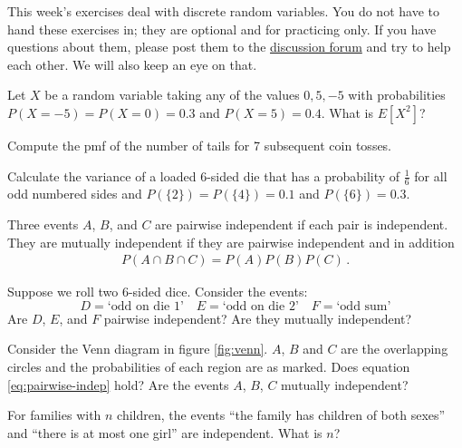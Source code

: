 \documentclass[a4paper,10pt,landscape,twocolumn]{scrartcl}
\begin{document}
\practiceproblems

{\sffamily\noindent
This week's exercises deal with discrete random variables. You do not have to hand these exercises in; they are optional and for practicing only. If you have questions about them, please post them to the \href{https://www.moodle.ch/lms/mod/forum/view.php?id=1634}{discussion forum} and try to help each other. We will also keep an eye on that.
}


\begin{exercise}[]
Let $X$ be a random variable taking any of the values $0, 5, -5$ with probabilities $P(X=-5) = P(X	= 0) = 0.3$ and $P(X=5) = 0.4$. What is $E[X^2]$?
\end{exercise}

\begin{exercise}[]
Compute the pmf of the number of tails for 7 subsequent coin tosses.	
\end{exercise}

\begin{exercise}[]
	Calculate the variance of a loaded 6-sided die that has a probability of $\frac 1 6$ for all odd numbered sides and $P(\{2\}) = P(\{4\}) =0.1$ and $P(\{6\}) = 0.3$.
\end{exercise}


\begin{exercise}[Independence]
Three events $A$, $B$, and $C$ are pairwise independent if each pair is independent. They are mutually independent if they are pairwise independent and in addition
	\begin{align}\label{eq:pairwise-indep}
		P(A \cap B \cap C) = P(A) P(B) P(C) \, .
	\end{align}
	\begin{subex}
	Suppose we roll two 6-sided dice. Consider the events:
	\[
		D = \text{`odd on die 1'} \quad
		E = \text{`odd on die 2'} \quad
		F = \text{`odd sum'}
	\]
	Are $D$, $E$, and $F$ pairwise independent? Are they mutually independent?	
	\end{subex}
	
	\begin{subex}
		Consider the Venn diagram in figure \ref{fig:venn}. $A$, $B$ and $C$ are the overlapping circles and the probabilities of each region are as marked. Does equation \ref{eq:pairwise-indep} hold? Are the events $A$, $B$, $C$ mutually independent?
	\end{subex}
	
	\begin{subex}
	For families with $n$ children, the events ``the family has children of both sexes'' and ``there is at most one girl'' are independent. What is $n$?
	\end{subex}


\end{exercise}
\end{document}
